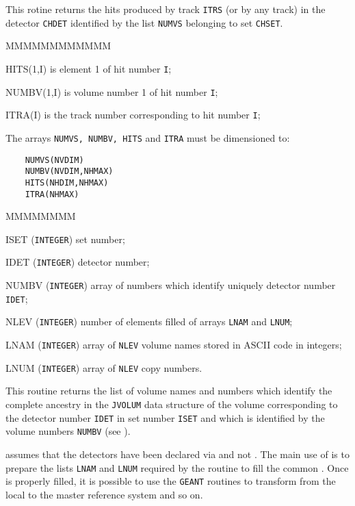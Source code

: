 This rotine returns the hits produced by track {\tt ITRS} (or by any track) in
the detector {\tt CHDET} identified by the list {\tt NUMVS}
belonging to set {\tt CHSET}.

\begin{DLtt}{MMMMMMMMMMMM}
\item[HITS(1,I)] is element 1 of hit number {\tt I};
\item[NUMBV(1,I)] is volume number 1 of hit number {\tt I};
\item[ITRA(I)] is the track number corresponding to hit number {\tt I};
\end{DLtt}

The arrays {\tt NUMVS, NUMBV, HITS}
and {\tt ITRA} must be dimensioned to:
\begin{verbatim}
    NUMVS(NVDIM)
    NUMBV(NVDIM,NHMAX)
    HITS(NHDIM,NHMAX)
    ITRA(NHMAX)
\end{verbatim}

\begin{DLtt}{MMMMMMMM}
\item[ISET] ({\tt INTEGER}) set number;
\item[IDET] ({\tt INTEGER}) detector number;
\item[NUMBV] ({\tt INTEGER}) array of numbers which identify uniquely
detector number {\tt IDET};
\item[NLEV] ({\tt INTEGER}) number of elements filled of arrays
{\tt LNAM} and {\tt LNUM};
\item[LNAM] ({\tt INTEGER}) array of {\tt NLEV} volume names stored in 
ASCII code in integers;
\item[LNUM] ({\tt INTEGER}) array of {\tt NLEV} copy numbers.
\end{DLtt}

This routine returns the list of volume names and numbers
which identify the complete ancestry in the {\tt JVOLUM} data structure of the
volume corresponding to the detector number {\tt IDET} in set
number {\tt ISET} and which is identified by the volume numbers {\tt NUMBV}
(see ).
 
 assumes that the detectors have been declared via 
 and not . The main use of  is to
prepare the lists {\tt LNAM} and {\tt LNUM} required  by the routine
 to fill the common . Once 
is properly filled, it is possible to use the {\tt GEANT} routines to
transform from the local to the master reference system and so on.
 

